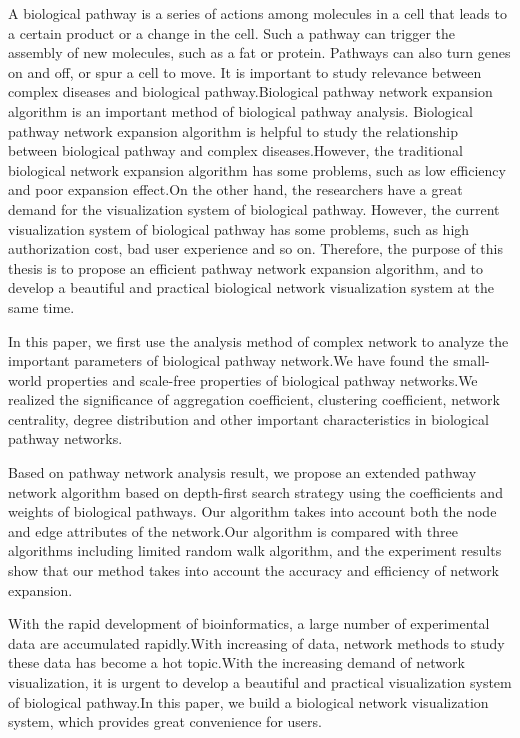 \begin{eabstract}
A biological pathway is a series of actions among molecules in a cell that leads to a certain product or a change in the cell. Such a pathway can trigger the assembly of new molecules, such as a fat or protein. Pathways can also turn genes on and off, or spur a cell to move. It is important to study relevance between complex diseases and biological pathway.Biological pathway network expansion algorithm is an important method of biological pathway analysis. Biological pathway network expansion algorithm is helpful to study the relationship between biological pathway and complex diseases.However, the traditional biological network expansion algorithm has some problems, such as low efficiency and poor expansion effect.On the other hand, the researchers have a great demand for the visualization system of biological pathway. However, the current visualization system of biological pathway has some problems, such as high authorization cost, bad user experience and so on. Therefore, the purpose of this thesis is to propose an efficient pathway network expansion algorithm, and to develop a beautiful and practical biological network visualization system at the same time.

In this paper, we first use the analysis method of complex network to analyze the important parameters of biological pathway network.We have found the small-world properties and scale-free properties of biological pathway networks.We realized the significance of aggregation coefficient, clustering coefficient, network centrality, degree distribution and other important characteristics in biological pathway networks.

Based on pathway network analysis result, we propose an extended pathway network algorithm based on depth-first search strategy using the  coefficients and weights of biological pathways. Our algorithm takes into account both the node and edge attributes of the network.Our algorithm is compared with three algorithms including limited random walk algorithm, and the experiment results show that our method takes into account the accuracy and efficiency of network expansion.

With the rapid development of bioinformatics, a large number of experimental data are accumulated rapidly.With increasing of data, network methods to study these data has become a hot topic.With the increasing demand of network visualization, it is urgent to develop a beautiful and practical visualization system of biological pathway.In this paper, we build a biological network visualization system, which provides great convenience for users.

\end{eabstract}
